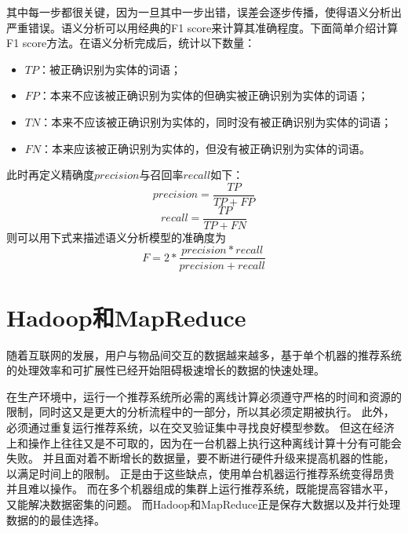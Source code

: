 其中每一步都很关键，因为一旦其中一步出错，误差会逐步传播，使得语义分析出严重错误。语义分析可以用经典的F1 score来计算其准确程度。下面简单介绍计算F1 score方法。在语义分析完成后，统计以下数量：
\begin{center}
\begin{itemize}
	\item $TP$：被正确识别为实体的词语；
	\item $FP$：本来不应该被正确识别为实体的但确实被正确识别为实体的词语；
	\item $TN$：本来不应该被正确识别为实体的，同时没有被正确识别为实体的词语；
	\item $FN$：本来应该被正确识别为实体的，但没有被正确识别为实体的词语。
\end{itemize}
\end{center}
此时再定义精确度$precision$与召回率$recall$如下：
\begin{equation}
precision= \frac{TP}{TP+FP}
\end{equation}
\begin{equation}
recall= \frac{TP}{TP+FN}
\end{equation}
则可以用下式来描述语义分析模型的准确度为
\begin{equation}
F= 2* \frac{precision*recall}{precision+recall}
\end{equation}


\section{Hadoop和MapReduce}
随着互联网的发展，用户与物品间交互的数据越来越多，基于单个机器的推荐系统的处理效率和可扩展性已经开始阻碍极速增长的数据的快速处理。

在生产环境中，运行一个推荐系统所必需的离线计算必须遵守严格的时间和资源的限制，同时这又是更大的分析流程中的一部分，所以其必须定期被执行。
此外，必须通过重复运行推荐系统，以在交叉验证集中寻找良好模型参数。
但这在经济上和操作上往往又是不可取的，因为在一台机器上执行这种离线计算十分有可能会失败。
并且面对着不断增长的数据量，要不断进行硬件升级来提高机器的性能，以满足时间上的限制。
正是由于这些缺点，使用单台机器运行推荐系统变得昂贵并且难以操作。
而在多个机器组成的集群上运行推荐系统，既能提高容错水平，又能解决数据密集的问题。
而Hadoop和MapReduce正是保存大数据以及并行处理数据的的最佳选择。

